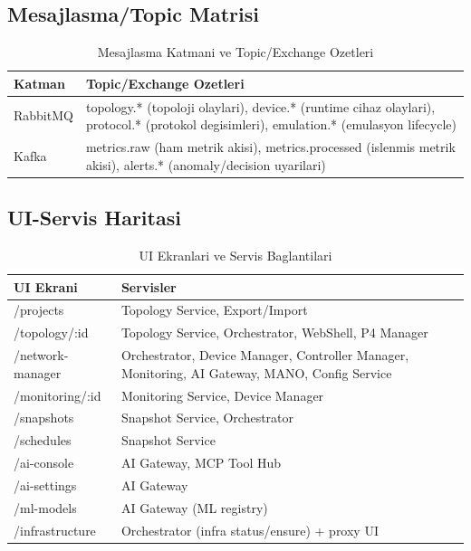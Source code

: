 \documentclass[conference]{IEEEtran}
\begin{document}
\subsection{Mesajlasma/Topic Matrisi}
\begin{table}[htbp]
\caption{Mesajlasma Katmani ve Topic/Exchange Ozetleri}
\label{tab:msg_matrix}
\centering
\scriptsize
\begin{tabularx}{\linewidth}{l Y}
\toprule
Katman & Topic/Exchange Ozetleri \\
\midrule
RabbitMQ & topology.* (topoloji olaylari), device.* (runtime cihaz olaylari), protocol.* (protokol degisimleri), emulation.* (emulasyon lifecycle) \\
Kafka & metrics.raw (ham metrik akisi), metrics.processed (islenmis metrik akisi), alerts.* (anomaly/decision uyarilari) \\
\bottomrule
\end{tabularx}
\end{table}

\subsection{UI-Servis Haritasi}
\begin{table}[t]
\caption{UI Ekranlari ve Servis Baglantilari}
\label{tab:ui_matrix}
\centering
\scriptsize
\begin{tabularx}{\textwidth}{l Y}
\toprule
UI Ekrani & Servisler \\
\midrule
/projects & Topology Service, Export/Import \\
/topology/:id & Topology Service, Orchestrator, WebShell, P4 Manager \\
/network-manager & Orchestrator, Device Manager, Controller Manager, Monitoring, AI Gateway, MANO, Config Service \\
/monitoring/:id & Monitoring Service, Device Manager \\
/snapshots & Snapshot Service, Orchestrator \\
/schedules & Snapshot Service \\
/ai-console & AI Gateway, MCP Tool Hub \\
/ai-settings & AI Gateway \\
/ml-models & AI Gateway (ML registry) \\
/infrastructure & Orchestrator (infra status/ensure) + proxy UI \\
\bottomrule
\end{tabularx}
\end{table}
\end{document}
